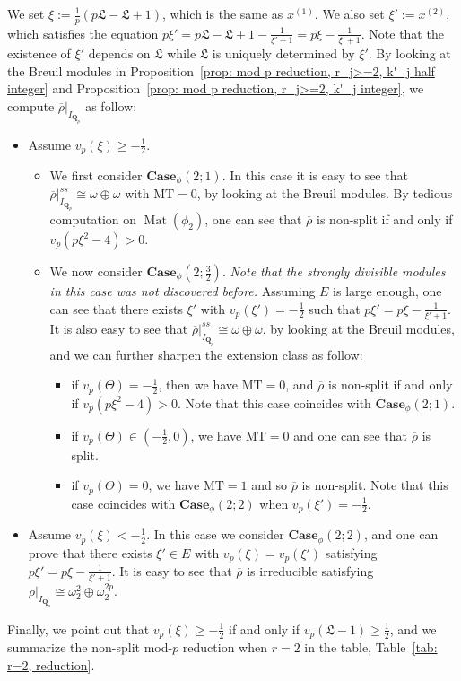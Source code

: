 \documentclass[11pt]{amsart}
\theoremstyle{definition}
\numberwithin{equation}{subsection}
\theoremstyle{plain}
\theoremstyle{plain}
\theoremstyle{plain}
\theoremstyle{plain}
\theoremstyle{plain}
\theoremstyle{plain}
\theoremstyle{plain}
\theoremstyle{plain}
\theoremstyle{plain}
\theoremstyle{plain}
\theoremstyle{plain}
\theoremstyle{plain}
\theoremstyle{definition}
\theoremstyle{definition}
\theoremstyle{definition}
\theoremstyle{remark}
\renewcommand{\(}{\textup{(}}
\renewcommand{\)}{\textup{)}}
\DeclareMathOperator{\Mat}{Mat}
\newcommand{\Qp}{\mathbf{Q}_p}
\newcommand{\rhobar}{\overline{\rho}}
\newcommand{\fL}{\mathfrak{L}}
\begin{document}
We set $\xi:=\frac{1}{p}(p\fL-\fL+1)$, which is the same as $x^{(1)}$. We also set $\xi':=x^{(2)}$, which satisfies the equation $p\xi'=p\fL-\fL+1-\frac{1}{\xi'+1}=p\xi-\frac{1}{\xi'+1}$. Note that the existence of $\xi'$ depends on $\fL$ while $\fL$ is uniquely determined by $\xi'$.
By looking at the Breuil modules in Proposition~\ref{prop: mod p reduction, r_j>=2, k'_j half integer} and Proposition~\ref{prop: mod p reduction, r_j>=2, k'_j integer}, we compute $\rhobar|_{I_{\Qp}}$ as follow:
\begin{itemize}[leftmargin=*]
\item Assume $v_p(\xi)\geq -\frac{1}{2}$.
\begin{itemize}[leftmargin=*]
    \item We first consider $\mathbf{Case}_\phi(2;1)$. In this case it is easy to see that $\rhobar|_{I_{\Qp}}^{ss}\cong\omega\oplus\omega$ with $\mathrm{MT}=0$, by looking at the Breuil modules. By tedious computation on $\Mat(\phi_2)$, one can see that $\rhobar$ is non-split if and only if $v_p(p\xi^2-4)>0$.
    \item We now consider $\mathbf{Case}_\phi(2;\frac{3}{2})$. \emph{Note that the strongly divisible modules in this case was not discovered before.} Assuming $E$ is large enough, one can see that there exists $\xi'$ with $v_p(\xi')=-\frac{1}{2}$ such that $p\xi'=p\xi-\frac{1}{\xi'+1}$. It is also easy to see that $\rhobar|_{I_{\Qp}}^{ss}\cong \omega\oplus\omega$, by looking at the Breuil modules, and we can further sharpen the extension class as follow:
    \begin{itemize}[leftmargin=*]
        \item if $v_p(\Theta)=-\frac{1}{2}$, then we have $\mathrm{MT}=0$, and $\rhobar$ is non-split if and only if $v_p(p\xi^2-4)>0$. Note that this case coincides with $\mathbf{Case}_\phi(2;1)$.
        \item if $v_p(\Theta)\in (-\frac{1}{2},0)$, we have $\mathrm{MT}=0$ and one can see that $\rhobar$ is split.
        \item if $v_p(\Theta)=0$, we have $\mathrm{MT}=1$ and so $\rhobar$ is non-split. Note that this case coincides with $\mathbf{Case}_\phi(2;2)$ when $v_p(\xi')=-\frac{1}{2}$.
    \end{itemize}
\end{itemize}
\item Assume $v_p(\xi)<-\frac{1}{2}$. In this case we consider $\mathbf{Case}_\phi(2;2)$, and one can prove that there exists $\xi'\in E$ with $v_p(\xi)=v_p(\xi')$ satisfying $p\xi'=p\xi-\frac{1}{\xi'+1}$. It is easy to see that $\rhobar$ is irreducible satisfying $\rhobar|_{I_{\Qp}}\cong\omega_2^2\oplus\omega_2^{2p}$.
\end{itemize}
Finally, we point out that $v_p(\xi)\geq -\frac{1}{2}$ if and only if $v_p(\fL-1)\geq \frac{1}{2}$, and we summarize the non-split mod-$p$ reduction when $r=2$ in the table, Table~\ref{tab: r=2, reduction}.
\end{document}
